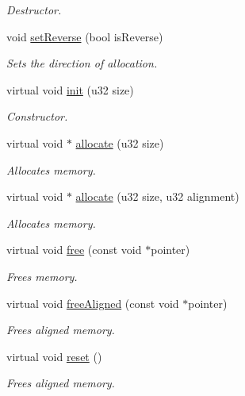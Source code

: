 \begin{DoxyCompactItemize}
\begin{DoxyCompactList}\small\item\em Destructor. \end{DoxyCompactList}\item 
void \hyperlink{classDE_1_1LinearAllocator_aee64419a4f3c40ac5163ebb744a55155}{set\+Reverse} (bool is\+Reverse)
\begin{DoxyCompactList}\small\item\em Sets the direction of allocation. \end{DoxyCompactList}\item 
virtual void \hyperlink{classDE_1_1LinearAllocator_a70c826a33cfbedec4a93d5c3869b3655}{init} (u32 size)
\begin{DoxyCompactList}\small\item\em Constructor. \end{DoxyCompactList}\item 
virtual void $\ast$ \hyperlink{classDE_1_1LinearAllocator_a4758d08eb92d0a78a614d40822180ae4}{allocate} (u32 size)
\begin{DoxyCompactList}\small\item\em Allocates memory. \end{DoxyCompactList}\item 
virtual void $\ast$ \hyperlink{classDE_1_1LinearAllocator_ae5a5125718d29914d63e6dfece2deead}{allocate} (u32 size, u32 alignment)
\begin{DoxyCompactList}\small\item\em Allocates memory. \end{DoxyCompactList}\item 
virtual void \hyperlink{classDE_1_1LinearAllocator_ae1913dde9c2b91738d42686fb08cc755}{free} (const void $\ast$pointer)
\begin{DoxyCompactList}\small\item\em Frees memory. \end{DoxyCompactList}\item 
virtual void \hyperlink{classDE_1_1LinearAllocator_a4199d84edd3d515e0db8512efdf1f208}{free\+Aligned} (const void $\ast$pointer)
\begin{DoxyCompactList}\small\item\em Frees aligned memory. \end{DoxyCompactList}\item 
virtual void \hyperlink{classDE_1_1LinearAllocator_a0dbec6e2529dc2f13757c104b17bbdda}{reset} ()\hypertarget{classDE_1_1LinearAllocator_a0dbec6e2529dc2f13757c104b17bbdda}{}\label{classDE_1_1LinearAllocator_a0dbec6e2529dc2f13757c104b17bbdda}

\begin{DoxyCompactList}\small\item\em Frees aligned memory. \end{DoxyCompactList}\end{DoxyCompactItemize}

